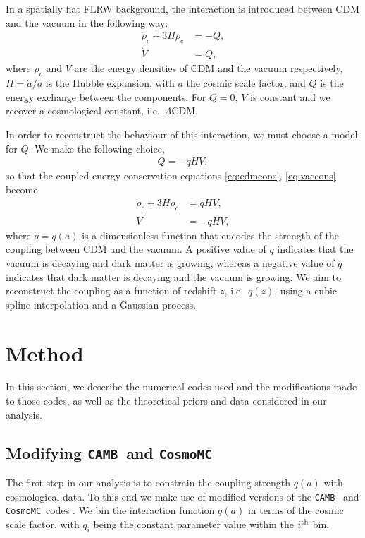 \documentclass[final,3p,times,twocolumn]{elsarticle}
\newcommand{\CAMB}{\texttt{CAMB}}
\newcommand{\CosmoMC}{\texttt{CosmoMC}}
\begin{document}
In a spatially flat FLRW background, the interaction is introduced between CDM and the vacuum in the following way:
\begin{align}
\dot{\rho}_c+ 3H \rho_c &= -Q, \label{eq:cdmcons} \\
\dot{V} &= Q, \label{eq:vaccons}
\end{align}
where $\rho_c$ and $V$ are the energy densities of CDM and the vacuum respectively, $H=\dot{a}/a$ is the Hubble expansion, with $a$ the cosmic scale factor,  and $Q$ is the energy exchange between the components. For $Q=0$, $ V$ is constant and we recover a cosmological constant, i.e.\ $\Lambda$CDM.

In order to reconstruct the behaviour of this interaction, we must choose a model  for $Q$. We make the following choice,
\begin{align}
    Q = -q H V,
\end{align}
so that the coupled energy conservation equations \eqref{eq:cdmcons}, \eqref{eq:vaccons} become
\begin{align}
\dot{\rho}_c+ 3H \rho_c &= q H V, \\
\dot{V} &= -q H V,
\end{align}
where $q=q(a)$ is a dimensionless function that encodes the strength of the coupling between CDM and the vacuum. A positive value of $q$ indicates that the vacuum is decaying and dark matter is growing, whereas a negative value of $q$ indicates that dark matter is decaying and the vacuum is growing. We aim to reconstruct the coupling as a function of redshift $z$, i.e.\ $q(z)$, using a cubic spline interpolation and a Gaussian process.

\section{Method}\label{sec:analysis}
In this section, we describe the numerical codes used and the modifications made to those codes, as well as the theoretical priors and data considered in our analysis.

\subsection{Modifying \CAMB~and \CosmoMC}\label{subsec:codes}
The first step in our analysis is to constrain the coupling strength $q(a)$ with cosmological data. To this end we make use of modified versions of the \CAMB~\citep{Lewis:1999bs,Howlett:2012mh} and \CosmoMC~codes \citep{Lewis:2002ah, Lewis:2013hha}. We bin the interaction function $q(a)$ in terms of the cosmic scale factor, with $q_i$ being the  constant parameter value within the $i^{\rm th}$ bin.
\end{document}
